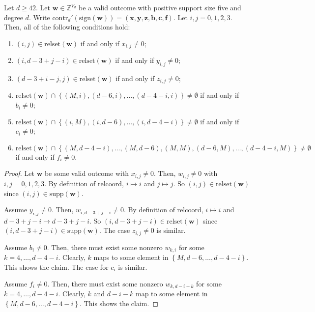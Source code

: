 \begin{proposition}\label{prop:iewjri3j3234212121112}
    Let \( d \geq 42 \). Let \( \mathbf{w} \in \mathbb{Z}^{V_d} \) be a valid outcome with positive support size five and degree \( d \). Write \( \mathrm{contr}_d'(\mathrm{sign}(\mathbf{w})) = (\mathbf{x},\mathbf{y},\mathbf{z},\mathbf{b},\mathbf{c},\mathbf{f} ) \). Let \( i,j = 0,1,2,3 \). Then, all of the following conditions hold:
    \begin{enumerate}
        \item \( (i,j) \in \mathrm{relset}(\mathbf{w}) \) if and only if \( x_{i,j} \neq 0 \);
        \item \( (i, d-3+j-i) \in \mathrm{relset}(\mathbf{w}) \) if and only if \( y_{i,j} \neq 0 \);
        \item \( (d-3+i-j,j) \in \mathrm{relset}(\mathbf{w}) \) if and only if \( z_{i,j} \neq 0 \);
        \item \( \mathrm{relset}(\mathbf{w}) \cap \left\{ (M,i), (d-6, i), \dots, (d-4-i, i) \right\} \neq \emptyset \) if and only if \( b_i \neq 0 \);
        \item \( \mathrm{relset}(\mathbf{w}) \cap \left\{ (i,M), (i, d-6), \dots, (i,d-4-i) \right\} \neq \emptyset \) if and only if \( c_i \neq 0 \);
        \item \( \mathrm{relset}(\mathbf{w}) \cap \left\{ (M, d-4-i), \dots, (M, d-6), (M,M), (d-6, M), \dots, (d-4-i, M) \right\} \neq \emptyset \) if and only if \( f_i \neq 0 \).
    \end{enumerate}
\end{proposition}

\begin{proof}
    Let \( \mathbf{w} \) be some valid outcome with \( x_{i,j} \neq 0 \). Then, \( w_{i,j} \neq 0 \) with \( i,j = 0, 1,2, 3 \). By definition of \( \mathrm{relcoord} \), \( i \mapsto i \) and \( j \mapsto j \). So \( (i,j) \in \mathrm{relset}(\mathbf{w}) \) since \( (i,j) \in \mathrm{supp}(\mathbf{w}) \).

    Assume \( y_{i,j} \neq 0 \). Then, \( w_{i, d-3+j-i} \neq 0 \). By definition of \( \mathrm{relcoord} \), \( i \mapsto i \) and \( d-3+j-i \mapsto d-3+j-i \). So \( (i,d-3+j-i) \in \mathrm{relset}(\mathbf{w}) \) since \( (i,d-3+j-i) \in \mathrm{supp}(\mathbf{w}) \). The case \( z_{i,j} \neq 0 \) is similar.

    Assume \( b_{i} \neq 0 \). Then, there must exist some nonzero \( w_{k, i} \) for some \( k = 4, \dots, d-4-i \). Clearly, \( k \) maps to some element in \( \left\{ M, d-6, \dots, d-4-i \right\} \). This shows the claim. The case for \( c_i \) is similar.

    Assume \( f_{i} \neq 0 \). Then, there must exist some nonzero \( w_{k, d-i-k} \) for some \( k = 4, \dots, d-4-i \). Clearly, \( k \) and \( d-i-k \)  map to some element in \( \left\{ M, d-6, \dots, d-4-i \right\} \). This shows the claim.
\end{proof}

